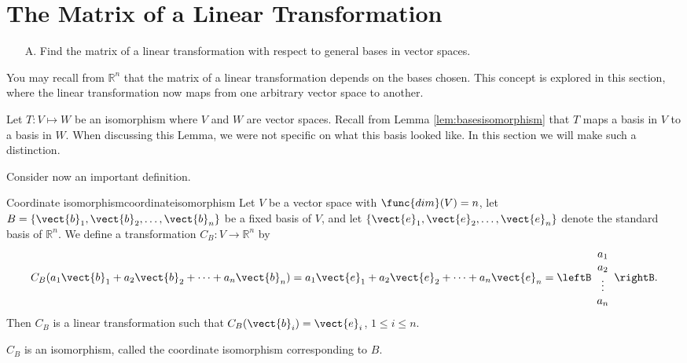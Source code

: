 \section{The Matrix of a Linear Transformation}

\begin{outcome}

\begin{enumerate}

\item[A.] Find the matrix of a linear transformation with respect to general bases in vector spaces. 

\end{enumerate}
\end{outcome}

You may recall from $\mathbb{R}^n$ that the matrix of a linear transformation depends on the bases chosen. This concept is explored in this section, where the linear transformation now maps from one arbitrary vector space to another. 

Let $T: V \mapsto W$ be an isomorphism where $V$ and $W$ are vector spaces. Recall from Lemma \ref{lem:basesisomorphism} that $T$ maps a basis in $V$ to a basis in $W$. When discussing this Lemma, we were not specific on what this basis looked like. In this section we will make such a distinction. 

Consider now an important definition.

\begin{definition}{Coordinate isomorphism}{coordinateisomorphism}
Let $V$ be a vector space with $\func{dim}(V)=n$, let $B=\{ \vect{b}_1, \vect{b}_2, \ldots, \vect{b}_n \}$ be a fixed basis of $V$,
and let $\{ \vect{e}_1, \vect{e}_2, \ldots, \vect{e}_n \}$
denote the standard basis of $\mathbb{R}^n$.
We define a transformation $C_B:V\to\mathbb{R}^n$ by
\[
C_B(a_1\vect{b}_1 + a_2\vect{b}_2 + \cdots + a_n\vect{b}_n)
=
a_1\vect{e}_1 + a_2\vect{e}_2 + \cdots + a_n\vect{e}_n
=
\leftB\begin{array}{c} a_1 \\ a_2 \\ \vdots \\ a_n
\end{array}\rightB.\]
Then $C_B$ is a linear transformation
such that
$C_B(\vect{b}_i)=\vect{e}_i$, $1\leq i\leq n$.

$C_B$ is an isomorphism, called
the coordinate isomorphism corresponding to $B$.
\end{definition}

